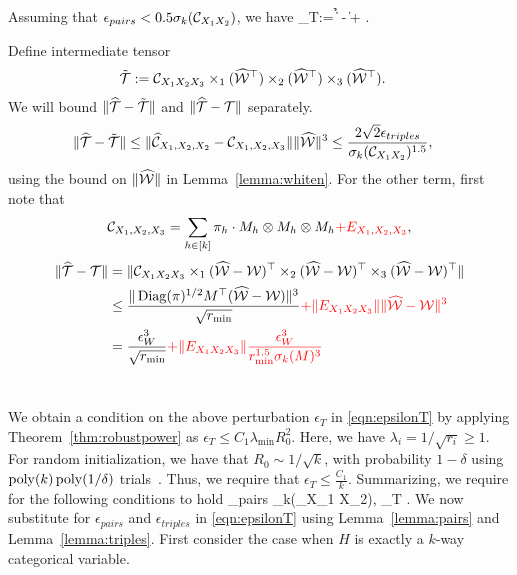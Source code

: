 \begin{lemma}
Assuming that $\epsilon_{pairs} < 0.5 \sigma_k(\mathcal{C}_{X_1 X_2})$, we have
\beq\label{eqn:epsilonT} \epsilon_T:= \|\h{\Tcal} - \Tcal\|
\leq {}+
.\eeq
\end{lemma}


\bprf  Define
  intermediate tensor
\begin{align*} \tl{\Tcal}&:= \Ccal_{X_1 X_2 X_3} \times_1 (\h{\Wcal}^\top) \times_2 (\h{\Wcal}^\top) \times_3 (\h{\Wcal}^\top).\end{align*}
We will bound $\|\widehat{{\mathcal{T}}}-\tilde{{\mathcal{T}}}\|$  and $\| \widehat{{\mathcal{T}}}-{\mathcal{T}}\|$  separately.
\begin{align*}
\|\widehat{{\mathcal{T}}}-\tilde{{\mathcal{T}}}\| &\leq \|\widehat{\mathcal{C}}_{X_1, X_2, X_2} - \mathcal{C}_{X_1, X_2, X_3}\| \|\widehat{\mathcal{W}}\|^3\leq \frac{2\sqrt{2}\epsilon_{triples}}{\sigma_k(\mathcal{C}_{X_1 X_2})^{1.5} },
\end{align*}using the bound on $\|\widehat{\mathcal{W}}\|$ in Lemma~\ref{lemma:whiten}. For the other term,
first note that
\[ \mathcal{C}_{X_1, X_2, X_3} = \sum_{h\in [k]} \pi_h \cdot M_h \otimes M_h \otimes M_h \textcolor{red}{+ E_{X_1, X_2, X_3}}, \]
\begin{align*} \|\widehat{{\mathcal{T}}}-{\mathcal{T}}\|&= \| \mathcal{C}_{X_1 X_2 X_3}\times_1 (\widehat{\mathcal{W}} -\mathcal{W})^\top \times_2 (\widehat{\mathcal{W}} -\mathcal{W})^\top \times_3 (\widehat{\mathcal{W}}-\mathcal{W})^\top\| \\
&\leq \frac{ \| \operatorname{Diag}(\pi)^{1/2}M^\top(\widehat{\mathcal{W}}-\mathcal{W})\|^3}{\sqrt{r_{\min}}}
\textcolor{red}{+ \|E_{X_1 X_2 X_3}\| \|\widehat{\mathcal{W}}-\mathcal{W}\|^3}\\
&= \frac{\epsilon_W^3}{\sqrt{r_{\min}}}
\textcolor{red}{+ \|E_{X_1 X_2 X_3}\| \frac{\epsilon_W^3}{r_{\min}^{1.5} \sigma_k(M)^3} }
\end{align*}
\eprf\\




We obtain a condition on the above perturbation $\epsilon_T$ in \eqref{eqn:epsilonT} by applying Theorem~\ref{thm:robustpower} as
$ \epsilon_T\leq C_1\lambda_{\min} R_0^2$. Here, we have $\lambda_{i} = 1/\sqrt{r_{i}}\geq 1$. For random initialization, we have that $R_0 \sim 1/\sqrt{k}$, with probability $1-\delta$ using $\operatorname{poly}(k) \operatorname{poly}(1/\delta)$ trials~\cite[Thm. 5.1]{AnandkumarEtal:tensor12}. Thus, we require that $ \epsilon_T  \leq \frac{C_1}{k}$. Summarizing, we require for the following conditions to hold
\beq\epsilon_{pairs} \sigma_k(\Ccal_{X_1 X_2}), \quad \epsilon_T  \leq {}.\eeq
We now substitute for $\epsilon_{pairs}$ and $\epsilon_{triples}$ in \eqref{eqn:epsilonT} using Lemma~\ref{lemma:pairs} and Lemma~\ref{lemma:triples}. First consider the case when   $H$ is exactly a $k$-way categorical variable.

